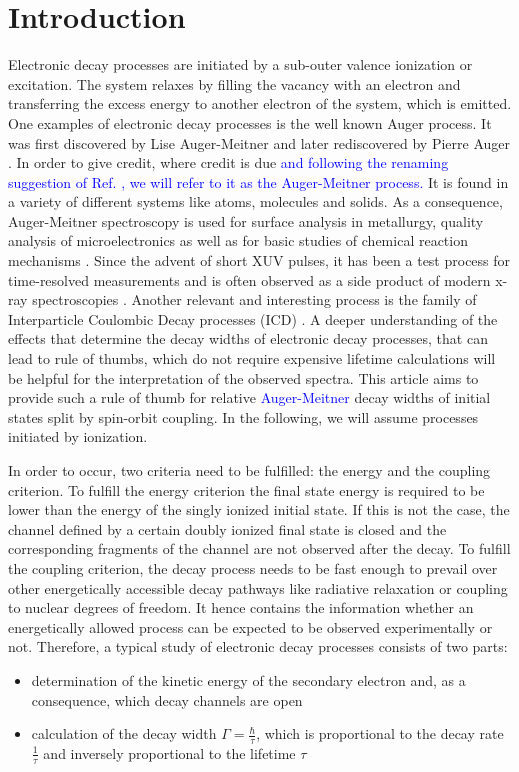 \section{Introduction}
Electronic decay processes are initiated by a sub-outer valence ionization
or excitation. The system relaxes by filling the vacancy with an electron and
transferring the excess energy to another electron of the system, which is emitted.
One examples of electronic decay processes is the
well known Auger process. It was first discovered
by Lise Auger-Meitner \cite{Meitner22} and later rediscovered
by Pierre Auger \cite{Auger23}. In order to give credit, where credit is due
\textcolor{blue}
{and following the renaming suggestion of Ref. \cite{renameAuger19},
we will refer to it as the Auger-Meitner process.}
It is found in a variety of different systems like atoms, molecules and solids.
As a consequence, Auger-Meitner spectroscopy
is used for surface analysis in metallurgy,
quality analysis of microelectronics
as well as for basic studies of chemical reaction mechanisms \cite{AES_Seah_86}.
Since the advent of short XUV pulses, it has been a test process for
time-resolved measurements \cite{Smirnova03}
and is often observed as a side product of modern x-ray spectroscopies
\cite{Greczynski20}.
Another relevant and interesting process is the family of Interparticle
Coulombic Decay processes (ICD) \cite{Cederbaum97,Hergenhahn11,Jahnke15}.
A deeper understanding of the effects that determine the decay widths
of electronic decay processes, that
can lead to rule of thumbs, which do not require expensive lifetime
calculations will
be helpful for the interpretation of the observed spectra.
This article aims to provide such a rule of thumb for relative
\textcolor{blue}
{Auger-Meitner}
decay widths
of initial states split by spin-orbit coupling.
In the following, we will assume processes initiated by ionization.

In order to occur, two criteria need to be fulfilled: the energy and the coupling
criterion.
To fulfill the energy criterion the final state energy is required
to be lower than
the energy of the singly ionized initial state. If this is not the case, the
channel defined by a certain doubly ionized final state
is closed and the corresponding fragments of the
channel are not observed after the decay.
To fulfill the coupling criterion, the decay process needs to be fast enough
to prevail over other energetically accessible decay pathways like radiative
relaxation or coupling to nuclear degrees of freedom.
It hence contains
the information whether an energetically allowed process can be expected
to be observed experimentally or not.
Therefore, a typical study of electronic decay processes consists of two parts:
\begin{itemize}
 \item determination of the kinetic energy of the secondary electron
       and, as a consequence, which decay channels are open
 \item calculation of the decay width $\Gamma=\frac{\hbar}{\tau}$, which
       is proportional to the decay rate $\frac{1}{\tau}$ and
       inversely proportional to the lifetime $\tau$
\end{itemize}


